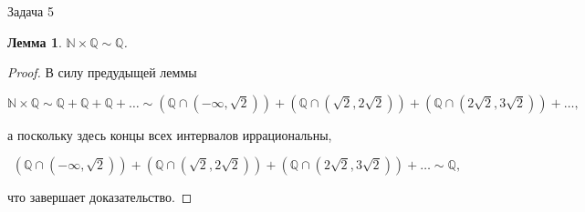\documentclass{article}
\newtheorem{lemma}{Лемма}
\newcommand{\N}{\mathbb{N}}
\newcommand{\Q}{\mathbb{Q}}
\begin{document}
\begin{section}{Задача 5}
		\begin{lemma}
			$\N \times \Q \sim \Q$.
		\end{lemma}

		\begin{proof}
			В силу предудыщей леммы

			\begin{equation*}
				\N \times \Q \sim \Q + \Q + \Q + \dots \sim (\Q \cap (-\infty, \sqrt{2})) + (\Q \cap (\sqrt{2}, 2\sqrt{2})) + (\Q \cap (2\sqrt{2}, 3\sqrt{2})) + \dots,
			\end{equation*}

			а поскольку здесь концы всех интервалов иррациональны,

			\begin{equation*}
				(\Q \cap (-\infty, \sqrt{2})) + (\Q \cap (\sqrt{2}, 2\sqrt{2})) + (\Q \cap (2\sqrt{2}, 3\sqrt{2})) + \dots \sim \Q,
			\end{equation*}

			что завершает доказательство.
		\end{proof}
	\end{section}
\end{document}
